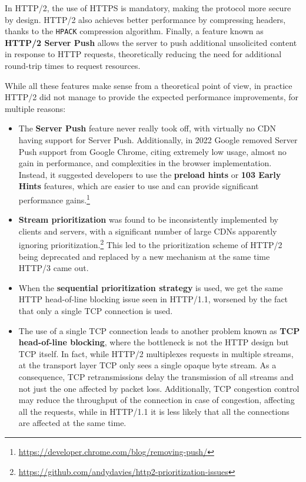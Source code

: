 In HTTP/2, the use of HTTPS is mandatory, making the protocol more secure by design. HTTP/2 also achieves better performance by compressing headers, thanks to the \texttt{HPACK} compression algorithm. Finally, a feature known as \textbf{HTTP/2 Server Push} allows the server to push additional unsolicited content in response to HTTP requests, theoretically reducing the need for additional round-trip times to request resources.

While all these features make sense from a theoretical point of view, in practice HTTP/2 did not manage to provide the expected performance improvements, for multiple reasons:

\begin{itemize}
    \item The \textbf{Server Push} feature never really took off, with virtually no CDN having support for Server Push. Additionally, in 2022 Google removed Server Push support from Google Chrome, citing extremely low usage, almost no gain in performance, and complexities in the browser implementation. Instead, it suggested developers to use the \textbf{preload hints} or \textbf{103 Early Hints} features, which are easier to use and can provide significant performance gains.\footnote{\url{https://developer.chrome.com/blog/removing-push/}}
    \item \textbf{Stream prioritization} was found to be inconsistently implemented by clients and servers, with a significant number of large CDNs apparently ignoring prioritization.\footnote{\url{https://github.com/andydavies/http2-prioritization-issues}} This led to the prioritization scheme of HTTP/2 being deprecated and replaced by a new mechanism at the same time HTTP/3 came out.
    \item When the \textbf{sequential prioritization strategy} is used, we get the same HTTP head-of-line blocking issue seen in HTTP/1.1, worsened by the fact that only a single TCP connection is used.
    \item The use of a single TCP connection leads to another problem known as \textbf{TCP head-of-line blocking}, where the bottleneck is not the HTTP design but TCP itself. In fact, while HTTP/2 multiplexes requests in multiple streams, at the transport layer TCP only sees a single opaque byte stream. As a consequence, TCP retransmissions delay the transmission of all streams and not just the one affected by packet loss. Additionally, TCP congestion control may reduce the throughput of the connection in case of congestion, affecting all the requests, while in HTTP/1.1 it is less likely that all the connections are affected at the same time.
\end{itemize}

